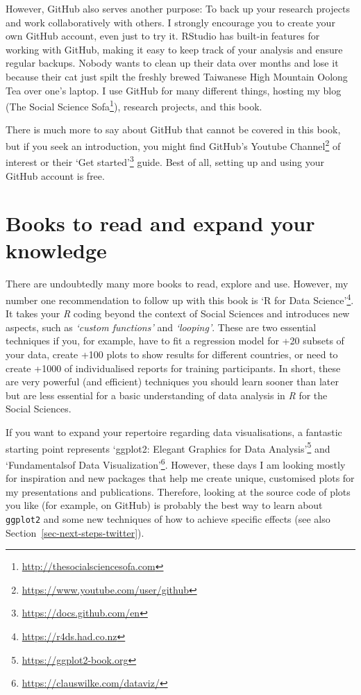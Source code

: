 \documentclass[
  letterpaper,
]{krantz}
\renewcommand{\href}[2]{#2\footnote{\url{#1}}}
\begin{document}
However, GitHub also serves another purpose: To back up your research
projects and work collaboratively with others. I strongly encourage you
to create your own GitHub account, even just to try it. RStudio has
built-in features for working with GitHub, making it easy to keep track
of your analysis and ensure regular backups. Nobody wants to clean up
their data over months and lose it because their cat just spilt the
freshly brewed Taiwanese High Mountain Oolong Tea over one's laptop. I
use GitHub for many different things, hosting my blog
(\href{http://thesocialsciencesofa.com}{The Social Science Sofa}),
research projects, and this book.

There is much more to say about GitHub that cannot be covered in this
book, but if you seek an introduction, you might find
\href{https://www.youtube.com/user/github}{GitHub's Youtube Channel} of
interest or their \href{https://docs.github.com/en}{`Get started'}
guide. Best of all, setting up and using your GitHub account is free.

\section{Books to read and expand your
knowledge}\label{sec-next-steps-books}

There are undoubtedly many more books to read, explore and use. However,
my number one recommendation to follow up with this book is
\href{https://r4ds.had.co.nz}{`R for Data Science'}. It takes your
\emph{R} coding beyond the context of Social Sciences and introduces new
aspects, such as \emph{`custom functions'} and \emph{`looping'}. These
are two essential techniques if you, for example, have to fit a
regression model for +20 subsets of your data, create +100 plots to show
results for different countries, or need to create +1000 of
individualised reports for training participants. In short, these are
very powerful (and efficient) techniques you should learn sooner than
later but are less essential for a basic understanding of data analysis
in \emph{R} for the Social Sciences.

If you want to expand your repertoire regarding data visualisations, a
fantastic starting point represents
\href{https://ggplot2-book.org}{`ggplot2: Elegant Graphics for Data
Analysis'} and \href{https://clauswilke.com/dataviz/}{`Fundamentalsof
Data Visualization'}. However, these days I am looking mostly for
inspiration and new packages that help me create unique, customised
plots for my presentations and publications. Therefore, looking at the
source code of plots you like (for example, on GitHub) is probably the
best way to learn about \texttt{ggplot2} and some new techniques of how
to achieve specific effects (see also
Section~\ref{sec-next-steps-twitter}).
\end{document}
